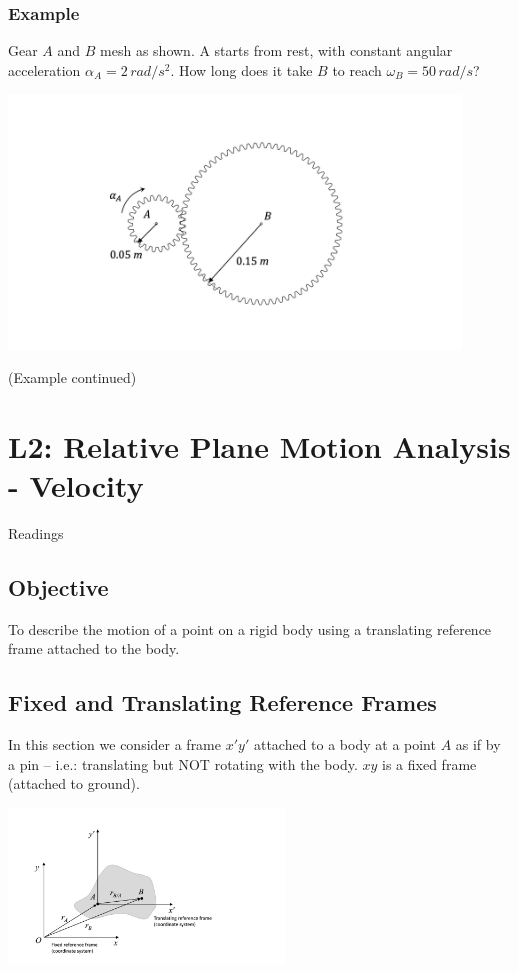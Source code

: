 \documentclass[12pt,letterpaper,twoside]{report}
\begin{document}
\subsection{Example}
\begin{minipage}[l]{0.4\textwidth}
Gear $A$ and $B$ mesh as shown.  A starts from rest, with constant angular acceleration $\alpha_A=2 \, rad/s^2$. How long does it take $B$ to reach $\omega_B=50 \, rad/s$?
\end{minipage}
\begin{minipage}[c]{0.6\textwidth}
\includegraphics[trim={7cm 3cm 8cm 3cm},clip,width=0.9\textwidth, center]{Slide10}
\end{minipage}

\newpage

(Example continued)

\newpage

\chapter{L2: Relative Plane Motion Analysis - Velocity}
Readings

\section{Objective}
To describe the motion of a point on a rigid body using a translating reference frame attached to the body.

\section{Fixed and Translating Reference Frames}
In this section we consider a frame $x'y'$ attached to a body at a point $A$ as if by a pin – i.e.: translating but NOT rotating with the body. $xy$ is a fixed frame (attached to ground). 

\includegraphics[trim={3cm 0cm 7.5cm 1.5cm},clip,width=0.55\textwidth, center]{Slide5}
\end{document}
